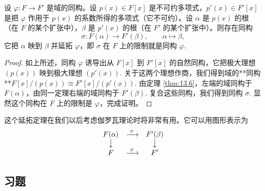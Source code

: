\begin{theorem}\label{thm:13.8}
设 \(\varphi : F \to F'\) 是域的同构。设 \(p(x) \in F[x]\) 是不可约多项式，\(p'(x) \in F'[x]\) 是把 \(\varphi\) 作用于 \(p(x)\) 的系数所得的多项式（它不可约）。设 \(\alpha\) 是 \(p(x)\) 的根（在 \(F\) 的某个扩张中），\(\beta\) 是 \(p'(x)\) 的根（在 \(F'\) 的某个扩张中）。则存在同构
\[
\sigma : F(\alpha) \to F'(\beta), \qquad \alpha \mapsto \beta,
\]
它把 \(\alpha\) 映到 \(\beta\) 并延拓 \(\varphi\)，即 \(\sigma\) 在 \(F\) 上的限制就是同构 \(\varphi\).
\end{theorem}

\begin{proof}
如上所述，同构 \(\varphi\) 诱导出从 \(F[x]\) 到 \(F'[x]\) 的自然同构，它把极大理想 \((p(x))\) 映到极大理想 \((p'(x))\). 关于这两个理想作商，我们得到域的**同构**\(F[x]/(p(x)) \cong F'[x]/(p'(x))\). 由定理 \ref{thm:13.6}，左端的域同构于 \(F(\alpha)\)，由同一定理右端的域同构于 \(F'(\beta)\). 复合这些同构，我们得到同构 \(\sigma\). 显然这个同构在 \(F\) 上的限制是 \(\varphi\)，完成证明。
\end{proof}

这个延拓定理在我们以后考虑伽罗瓦理论时将非常有用。它可以用图形表示为
\[
\begin{array}{ccc}
F(\alpha) & \xrightarrow{\ \sigma\ } & F'(\beta)\\
\big\downarrow & & \big\downarrow\\
F & \xrightarrow{\ \varphi\ } & F'
\end{array}
\]

\subsection*{习题}

